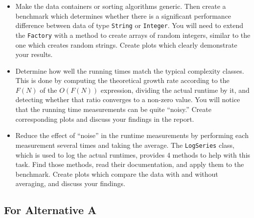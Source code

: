 \documentclass[a4paper,10pt]{article}
\begin{document}
\begin{itemize}

\item
  Make the data containers or sorting algorithms generic.
  Then create a benchmark which determines whether there is a significant performance difference between data of type \texttt{String} or \texttt{Integer}.
  You will need to extend the \texttt{Factory} with a method to create arrays of random integers, similar to the one which creates random strings.
  Create plots which clearly demonstrate your results.
  
\item
  Determine how well the running times match the typical complexity classes.
  This is done by computing the theoretical growth rate according to the $F(N)$ of the $O(F(N))$ expression, dividing the actual runtime by it, and detecting whether that ratio converges to a non-zero value.
  You will notice that the running time measurements can be quite ``noisy.''
  Create corresponding plots and discuss your findings in the report.
  
\item
  Reduce the effect of ``noise'' in the runtime measurements by performing each measurement several times and taking the average.
  The \texttt{LogSeries} class, which is used to log the actual runtimes, provides 4 methods to help with this task.
  Find those methods, read their documentation, and apply them to the benchmark.
  Create plots which compare the data with and without averaging, and discuss your findings.
  
\end{itemize}


\subsection*{For Alternative A}
\end{document}
